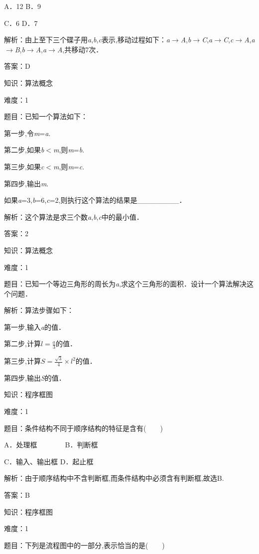 \documentclass{article} %
\begin{document}
A．12  B．9

C．6   D．7

解析：由上至下三个碟子用\textit{a},\textit{b},\textit{c}表示,移动过程如下：\textit{a}$\mathrm{\to}$\textit{A},\textit{b}$\mathrm{\to}$\textit{C},\textit{a}$\mathrm{\to}$\textit{C},\textit{c}$\mathrm{\to}$\textit{A},\textit{a}$\mathrm{\to}$\textit{B},\textit{b}$\mathrm{\to}$\textit{A},\textit{a}$\mathrm{\to}$\textit{A},共移动7次．

答案：D

知识：算法概念

难度：1

题目：已知一个算法如下：

第一步,令\textit{m}=\textit{a}.

第二步,如果\textit{b}$\mathrm{<}$\textit{m},则\textit{m}=\textit{b}.

第三步,如果\textit{c}$\mathrm{<}$\textit{m},则\textit{m}=\textit{c}.

第四步,输出\textit{m}.

如果\textit{a}=3,\textit{b}=6,\textit{c}=2,则执行这个算法的结果是\_\_\_\_\_\_\_\_．

解析：这个算法是求三个数\textit{a},\textit{b},\textit{c}中的最小值．

答案：2

知识：算法概念

难度：1

题目：已知一个等边三角形的周长为\textit{a},求这个三角形的面积．设计一个算法解决这个问题．

解析：算法步骤如下：

第一步,输入\textit{a}的值．

第二步,计算$l=\frac{a}{3}$的值．

第三步,计算$S=\frac{\sqrt{3}}{4}\times l^2$的值．

第四步,输出\textit{S}的值．


知识：程序框图

难度：1

题目：条件结构不同于顺序结构的特征是含有(　　)

A．处理框　　　　B．判断框

C．输入、输出框  D．起止框

解析：由于顺序结构中不含判断框,而条件结构中必须含有判断框,故选B.

答案：B

知识：程序框图

难度：1

题目：下列是流程图中的一部分,表示恰当的是(　　)
\end{document}
